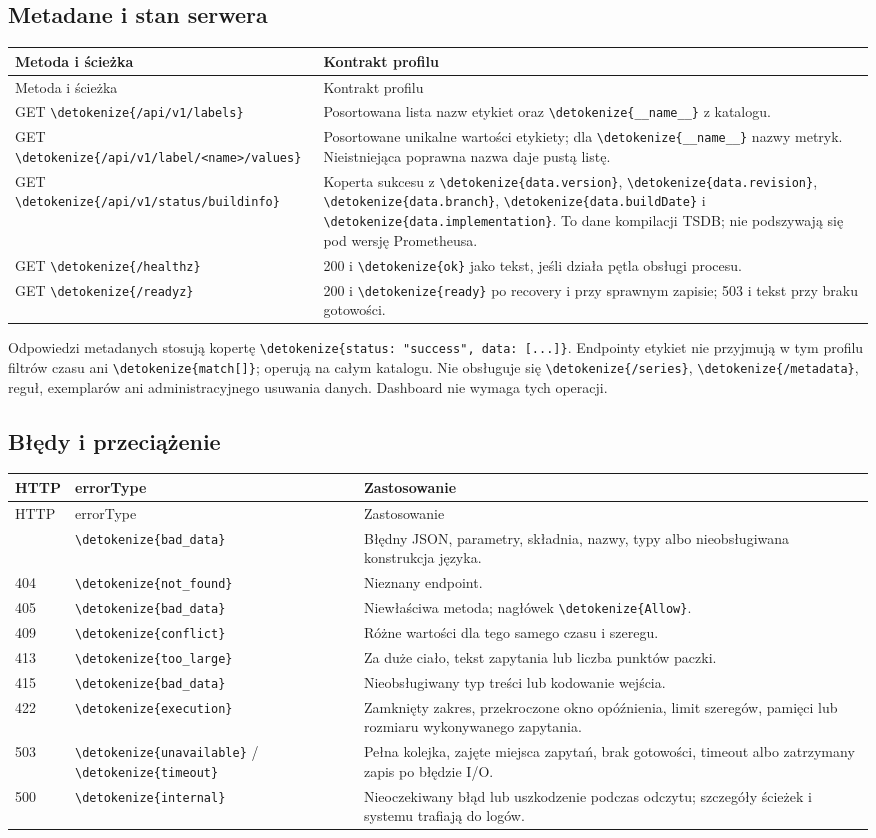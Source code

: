 \documentclass[11pt,a4paper]{article}
\newcommand{\code}[1]{\expandafter\nolinkurl\expandafter{\detokenize{#1}}}
\newcommand{\tabhead}[1]{\toprule #1\\ \midrule\endfirsthead
  \toprule #1\\ \midrule\endhead \bottomrule\endfoot}
\begin{document}
\subsection{Metadane i stan serwera}
\begin{longtable}{P{65mm}P{91mm}}
\tabhead{Metoda i ścieżka & Kontrakt profilu}
GET \code{/api/v1/labels} &
Posortowana lista nazw etykiet oraz \code{__name__} z katalogu.\\
GET \code{/api/v1/label/<name>/values} &
Posortowane unikalne wartości etykiety; dla \code{__name__} nazwy metryk.
Nieistniejąca poprawna nazwa daje pustą listę.\\
GET \code{/api/v1/status/buildinfo} &
Koperta sukcesu z \code{data.version}, \code{data.revision},
\code{data.branch}, \code{data.buildDate} i \code{data.implementation}.
To dane kompilacji TSDB; nie podszywają się pod wersję Prometheusa.\\
GET \code{/healthz} &
200 i \code{ok} jako tekst, jeśli działa pętla obsługi procesu.\\
GET \code{/readyz} &
200 i \code{ready} po recovery i przy sprawnym zapisie;
503 i tekst przy braku gotowości.\\
\end{longtable}

Odpowiedzi metadanych stosują kopertę
\code{status: "success", data: [...]}. Endpointy etykiet nie przyjmują
w tym profilu filtrów czasu ani \code{match[]}; operują na całym katalogu.
Nie obsługuje się \code{/series}, \code{/metadata}, reguł, exemplarów
ani administracyjnego usuwania danych. Dashboard nie wymaga tych operacji.

\subsection{Błędy i przeciążenie}
\label{sec:http-errors}
\begin{longtable}{P{14mm}P{39mm}P{103mm}}
\tabhead{HTTP & errorType & Zastosowanie}
400 & \code{bad_data} & Błędny JSON, parametry, składnia, nazwy,
typy albo nieobsługiwana konstrukcja języka.\\
404 & \code{not_found} & Nieznany endpoint.\\
405 & \code{bad_data} & Niewłaściwa metoda; nagłówek \code{Allow}.\\
409 & \code{conflict} & Różne wartości dla tego samego czasu i szeregu.\\
413 & \code{too_large} & Za duże ciało, tekst zapytania lub liczba punktów paczki.\\
415 & \code{bad_data} & Nieobsługiwany typ treści lub kodowanie wejścia.\\
422 & \code{execution} & Zamknięty zakres, przekroczone okno opóźnienia,
limit szeregów, pamięci lub rozmiaru wykonywanego zapytania.\\
503 & \code{unavailable} / \code{timeout} & Pełna kolejka, zajęte miejsca
zapytań, brak gotowości, timeout albo zatrzymany zapis po błędzie I/O.\\
500 & \code{internal} & Nieoczekiwany błąd lub uszkodzenie podczas odczytu;
szczegóły ścieżek i systemu trafiają do logów.\\
\end{longtable}
\end{document}

